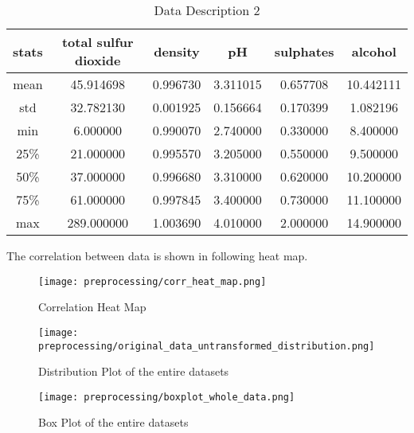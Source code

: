\begin{table}[H]
    \begin{center}
        \begin{tabular}{ |c|c|c|c|c|c| }
            \hline
            stats      & 
            total sulfur dioxide	&density&	pH	&sulphates&	alcohol	  \\
            \hline
            mean & 45.914698	&0.996730&	3.311015	&0.657708	&10.442111 \\
            \hline

            std & 32.782130	&0.001925&	0.156664&	0.170399&	1.082196	\\
            \hline

            min & 6.000000	&0.990070	&2.740000&	0.330000	&8.400000	 \\
            \hline

            25\% & 21.000000	&0.995570&	3.205000	&0.550000&	9.500000	 \\
            \hline

            50\% & 37.000000	&0.996680&	3.310000	&0.620000&	10.200000		 \\
            \hline

            75\% & 61.000000&	0.997845&	3.400000&	0.730000&	11.100000		 \\
            \hline

            max & 289.000000 &	1.003690&	4.010000&	2.000000&	14.900000	 \\
            \hline
        \end{tabular}
    \end{center}
    \caption{Data Description 2}
    \label{table:Data Description 2}
\end{table}

The correlation between data is shown in following heat map.
\begin{figure}[H]
    \centering
    \texttt{[image: preprocessing/corr\_heat\_map.png]}
    \caption{Correlation Heat Map}
    \label{fig:Correlation Heat Map}
\end{figure}

\begin{figure}[H]
    \centering
    \texttt{[image: preprocessing/original\_data\_untransformed\_distribution.png]}
    \caption{Distribution Plot of the entire datasets}
    \label{fig:Distribution Plot of the entire datasets}
\end{figure}

\begin{figure}[H]
    \centering
    \texttt{[image: preprocessing/boxplot\_whole\_data.png]}
    \caption{Box Plot of the entire datasets}
    \label{fig:Box Plot of the entire datasets}
\end{figure}

